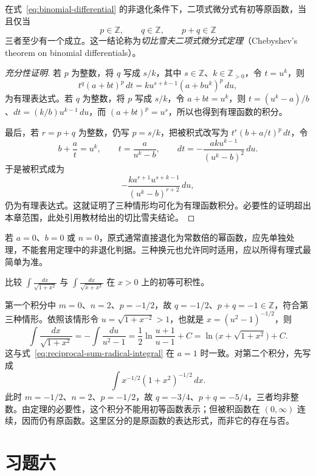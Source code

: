 \begin{theorem}[二项式微分式的初等可积条件]
\label{thm:chebyshev-binomial-integrals}
在式~\eqref{eq:binomial-differential} 的非退化条件下，二项式微分式有初等原函数，当且仅当
\begin{equation}
    p\in\mathbb{Z},\qquad q\in\mathbb{Z},\qquad
    p+q\in\mathbb{Z}
    \label{eq:binomial-elementary-integrability-conditions}
\end{equation}
三者至少有一个成立。这一结论称为\emph{切比雪夫二项式微分式定理}（Chebyshev's theorem on binomial differentials）。
\end{theorem}

\begin{proof}[充分性证明]
若 $p$ 为整数，将 $q$ 写成 $s/k$，其中 $s\in\mathbb{Z}$、$k\in\mathbb{Z}_{>0}$，令 $t=u^k$，则
\[
    t^q(a+bt)^p\,dt=k u^{s+k-1}(a+bu^k)^p\,du,
\]
为有理表达式。若 $q$ 为整数，将 $p$ 写成 $s/k$，令 $a+bt=u^k$，则 $t=(u^k-a)/b$、$dt=(k/b)u^{k-1}\,du$，而 $(a+bt)^p=u^s$，所以也得到有理函数的积分。

最后，若 $r=p+q$ 为整数，仍写 $p=s/k$，把被积式改写为 $t^r(b+a/t)^p\,dt$，令
\[
    b+\frac at=u^k,\qquad
    t=\frac{a}{u^k-b},\qquad
    dt=-\frac{ak u^{k-1}}{(u^k-b)^2}\,du.
\]
于是被积式成为
\[
    -\frac{k a^{r+1}u^{s+k-1}}{(u^k-b)^{r+2}}\,du,
\]
仍为有理表达式。这就证明了三种情形均可化为有理函数积分。必要性的证明超出本章范围，此处引用教材给出的切比雪夫结论。
\end{proof}

若 $a=0$、$b=0$ 或 $n=0$，原式通常直接退化为常数倍的幂函数，应先单独处理，不能套用定理中的非退化判据。三种换元也允许同时适用，应以所得有理式最简单为准。

\begin{example}
\label{ex:binomial-integrability-and-nonintegrability}
比较 $\displaystyle\int\frac{dx}{\sqrt{1+x^2}}$ 与 $\displaystyle\int\frac{dx}{\sqrt{x+x^3}}$ 在 $x>0$ 上的初等可积性。
\end{example}

\begin{solve}
第一个积分中 $m=0$、$n=2$、$p=-1/2$，故 $q=-1/2$、$p+q=-1\in\mathbb{Z}$，符合第三种情形。依照该情形令 $u=\sqrt{1+x^{-2}}>1$，也就是 $x=(u^2-1)^{-1/2}$，则
\[
    \int\frac{dx}{\sqrt{1+x^2}}
      =-\int\frac{du}{u^2-1}
      =\frac12\ln\frac{u+1}{u-1}+C
      =\ln\bigl(x+\sqrt{1+x^2}\bigr)+C.
\]
这与式~\eqref{eq:reciprocal-sum-radical-integral} 在 $a=1$ 时一致。对第二个积分，先写成
\[
    \int x^{-1/2}(1+x^2)^{-1/2}\,dx.
\]
此时 $m=-1/2$、$n=2$、$p=-1/2$，故 $q=-3/4$、$p+q=-5/4$，三者均非整数。由定理的必要性，这个积分不能用初等函数表示；但被积函数在 $(0,\infty)$ 连续，因而仍有原函数。这里区分的是原函数的表达形式，而非它的存在与否。
\end{solve}

\section*{习题六}

